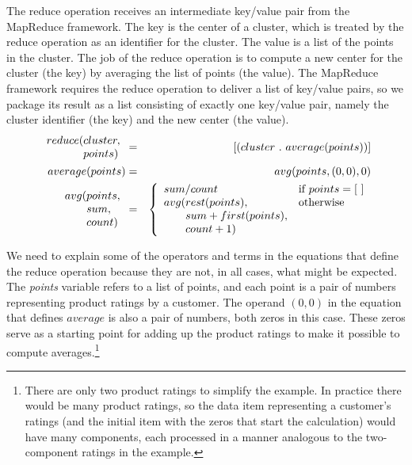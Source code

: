 The reduce operation receives
an intermediate key/value pair from the MapReduce framework.
The key is the center of a cluster, which is treated by the reduce operation
as an identifier for the cluster.
The value is a list of the points in the cluster.
The job of the reduce operation is to compute a new
center for the cluster (the key) by averaging the list of points (the value).
The MapReduce framework requires the reduce operation to deliver
a list of key/value pairs, so we package its result as a list consisting
of exactly one key/value pair, namely the cluster identifier (the key) and the
new center (the value).
\begin{eqnarray*}
    \begin{array}{l@{}l}
        reduce(&cluster, \\
               &points)
    \end{array} &=& [ ( cluster ~.~ average(points) ) ] \\
average(points) &=& avg(points, (0,0), 0) \\
\begin{array}{l@{}l}
    avg(&points, \\
        &sum, \\
        &count)
\end{array} &=&
    \left\{
        \begin{array}{l@{}ll}
            \multicolumn{2}{l}{sum / count} & \mbox{if } points = [~] \\
            avg(& rest(points),             & \mbox{otherwise} \\
                & sum+first(points),        & \\
                & count+1)                  & \\
        \end{array}
    \right.
\end{eqnarray*}

We need to explain some of the operators and terms
in the equations that define the reduce operation
because they are not, in all cases, what might be expected.
The \emph{points} variable refers to a list of points,
and each point is a pair of numbers representing product ratings
by a customer. 
The operand $(0,0)$ in the equation that defines $average$ is
also a pair of numbers, both zeros in this case.
These zeros serve as a starting point for adding
up the product ratings to make it possible to compute
averages.\footnote{There are only two product ratings
to simplify the example. In practice there would be
many product ratings, so the data item representing
a customer's ratings (and the initial item with the
zeros that start the calculation)
would have many components, each processed in a manner analogous
to the two-component ratings in the example.}

